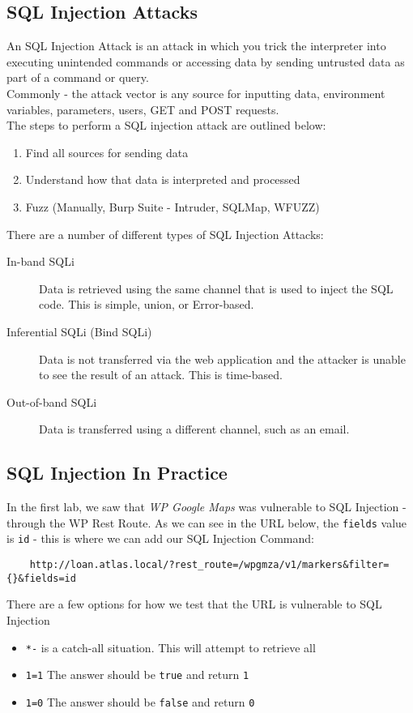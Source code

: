 \subsection{SQL Injection Attacks}
An SQL Injection Attack is an attack in which you trick the interpreter into executing unintended commands or accessing data by sending untrusted data as part of a command or query.\\

Commonly - the attack vector is any source for inputting data, environment variables, parameters, users, GET and POST requests.\\

The steps to perform a SQL injection attack are outlined below:
\begin{enumerate}
    \item Find all sources for sending data
    \item Understand how that data is interpreted and processed
    \item Fuzz (Manually, Burp Suite - Intruder, SQLMap, WFUZZ)
\end{enumerate}

There are a number of different types of SQL Injection Attacks:
\begin{description}
    \item[In-band SQLi] Data is retrieved using the same channel that is used to inject the SQL code. This is simple, union, or Error-based.
    \item[Inferential SQLi (Bind SQLi)] Data is not transferred via the web application and the attacker is unable to see the result of an attack. This is time-based.
    \item[Out-of-band SQLi] Data is transferred using a different channel, such as an email.   
\end{description}

\subsection{SQL Injection In Practice}
In the first lab, we saw that \textit{WP Google Maps} was vulnerable to SQL Injection - through the WP Rest Route. As we can see in the URL below, the \verb|fields| value is \verb|id| - this is where we can add our SQL Injection Command:
\begin{verbatim}
    http://loan.atlas.local/?rest_route=/wpgmza/v1/markers&filter={}&fields=id
\end{verbatim}

There are a few options for how we test that the URL is vulnerable to SQL Injection
\begin{itemize}
    \item \verb|*-| is a catch-all situation. This will attempt to retrieve all
    \item \verb|1=1| The answer should be \verb|true| and return \verb|1|
    \item \verb|1=0| The answer should be \verb|false| and return \verb|0|
\end{itemize}

